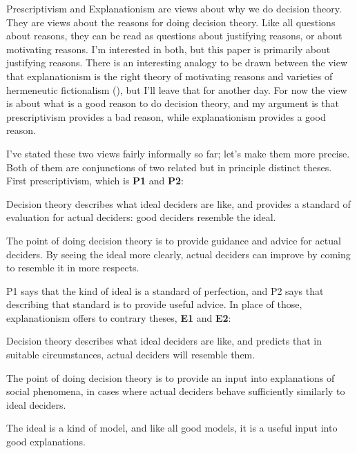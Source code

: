 \documentclass[
  11pt,
  letterpaper,
  DIV=11,
  numbers=noendperiod,
  twoside]{scrartcl}
\providecommand{\tightlist}{%
  \setlength{\itemsep}{0pt}\setlength{\parskip}{0pt}}
\begin{document}
Prescriptivism and Explanationism are views about why we do decision
theory. They are views about the reasons for doing decision theory. Like
all questions about reasons, they can be read as questions about
justifying reasons, or about motivating reasons. I'm interested in both,
but this paper is primarily about justifying reasons. There is an
interesting analogy to be drawn between the view that explanationism is
the right theory of motivating reasons and varieties of hermeneutic
fictionalism (),
but I'll leave that for another day. For now the view is about what is a
good reason to do decision theory, and my argument is that
prescriptivism provides a bad reason, while explanationism provides a
good reason.

I've stated these two views fairly informally so far; let's make them
more precise. Both of them are conjunctions of two related but in
principle distinct theses. First prescriptivism, which is \textbf{P1}
and \textbf{P2}:

\begin{description}
\tightlist
\item[P1]
Decision theory describes what ideal deciders are like, and provides a
standard of evaluation for actual deciders: good deciders resemble the
ideal.
\item[P2]
The point of doing decision theory is to provide guidance and advice for
actual deciders. By seeing the ideal more clearly, actual deciders can
improve by coming to resemble it in more respects.
\end{description}

P1 says that the kind of ideal is a standard of perfection, and P2 says
that describing that standard is to provide useful advice. In place of
those, explanationism offers to contrary theses, \textbf{E1} and
\textbf{E2}:

\begin{description}
\tightlist
\item[E1]
Decision theory describes what ideal deciders are like, and predicts
that in suitable circumstances, actual deciders will resemble them.
\item[E2]
The point of doing decision theory is to provide an input into
explanations of social phenomena, in cases where actual deciders behave
sufficiently similarly to ideal deciders.
\end{description}

The ideal is a kind of model, and like all good models, it is a useful
input into good explanations.
\end{document}
